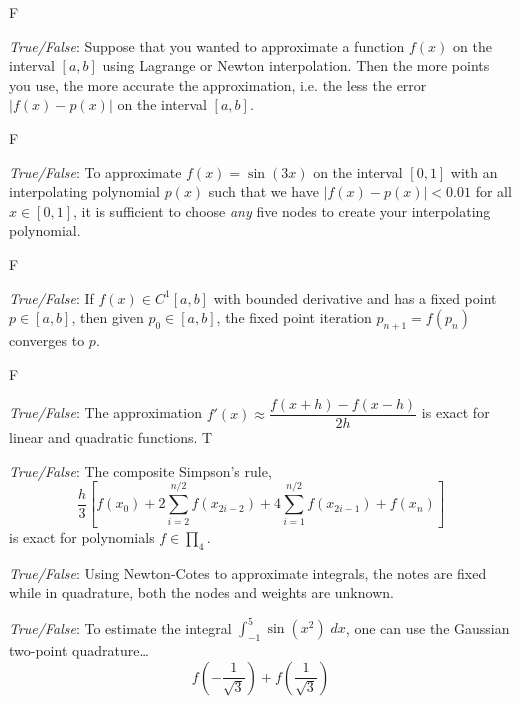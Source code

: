 \documentclass[11pt,letterpaper]{article}
\begin{document}
F


\quizsol \textit{True/False}: Suppose that you wanted to approximate a function $f(x)$ on the interval $[a, b]$ using Lagrange or Newton interpolation. Then the more points you use, the more accurate the approximation, i.e. the less the error $|f(x) - p(x)|$ on the interval $[a, b]$. 

F



\quizsol \textit{True/False}: To approximate $f(x)= \sin(3x)$ on the interval $[0, 1]$ with an interpolating polynomial $p(x)$ such that we have $|f(x) - p(x)| < 0.01$ for all $x \in [0, 1]$, it is sufficient to choose \textit{any} five nodes to create your interpolating polynomial. 

F


\quizsol \textit{True/False}: If $f(x) \in C^1[a, b]$ with bounded derivative and has a fixed point $p \in [a, b]$, then given $p_0 \in [a, b]$, the fixed point iteration $p_{n+1}= f(p_n)$ converges to $p$. 

F


\quizsol \textit{True/False}: The approximation $f'(x) \approx \dfrac{f(x + h) - f(x - h)}{2h}$ is exact for linear and quadratic functions. 
T



\quizsol \textit{True/False}: The composite Simpson's rule, 
	\[
	\dfrac{h}{3} \left[ f(x_0) + 2 \sum_{i=2}^{n/2} f(x_{2i-2}) + 4 \sum_{i=1}^{n/2} f(x_{2i-1}) + f(x_n) \right]
	\]
is exact for polynomials $f \in \prod_4$. 



\quizsol \textit{True/False}: Using Newton-Cotes to approximate integrals, the notes are fixed while in quadrature, both the nodes and weights are unknown. 



\quizsol \textit{True/False}: To estimate the integral $\displaystyle \int_{-1}^5 \sin(x^2) \;dx$, one can use the Gaussian two-point quadrature\dots
	\[
	f\left( -\dfrac{1}{\sqrt{3}} \right) + f\left( \dfrac{1}{\sqrt{3}} \right)
	\]
\end{document}

